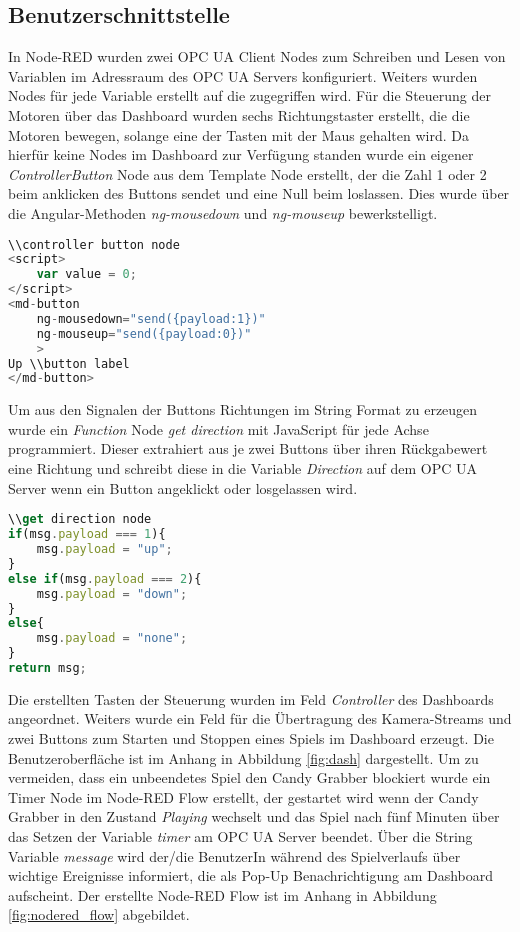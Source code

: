 \documentclass[BMR,Bachelor,ngerman]{twbook}%
\begin{document}
\subsection{Benutzerschnittstelle}
In Node-RED wurden zwei \ac{OPC UA} Client Nodes zum Schreiben und Lesen von Variablen im Adressraum des \ac{OPC UA} Servers konfiguriert. Weiters wurden Nodes für jede Variable erstellt auf die zugegriffen wird. Für die Steuerung der Motoren über das Dashboard wurden sechs Richtungstaster erstellt, die die Motoren bewegen, solange eine der Tasten mit der Maus gehalten wird. Da hierfür keine Nodes im Dashboard zur Verfügung standen wurde ein eigener \emph{ControllerButton} Node aus dem Template Node erstellt, der die Zahl 1 oder 2 beim anklicken des Buttons sendet und eine Null beim loslassen. Dies wurde über die Angular-Methoden \emph{ng-mousedown} und \emph{ng-mouseup} bewerkstelligt.
%
\begin{lstlisting}[language=JavaScript,caption={Programmierung des \emph{ControllerButton} Node für Richtung \emph{Up}},label={sc:callback}]
\\controller button node
<script>
    var value = 0;
</script>
<md-button
    ng-mousedown="send({payload:1})"
    ng-mouseup="send({payload:0})"
    >
Up \\button label
</md-button>
\end{lstlisting}
Um aus den Signalen der Buttons Richtungen im String Format zu erzeugen wurde ein \emph{Function} Node \emph{get direction} mit JavaScript für jede Achse programmiert. Dieser extrahiert aus je zwei Buttons über ihren Rückgabewert eine Richtung und schreibt diese in die Variable \emph{Direction} auf dem \ac{OPC UA} Server wenn ein Button angeklickt oder losgelassen wird.
\begin{lstlisting}[language=JavaScript,caption={Programmierung des \emph{get direction} Node für eine Achse},label={sc:callback}]
\\get direction node
if(msg.payload === 1){
    msg.payload = "up";
}
else if(msg.payload === 2){
    msg.payload = "down";
}
else{
    msg.payload = "none";
}
return msg;
\end{lstlisting}
%
Die erstellten Tasten der Steuerung wurden im Feld \emph{Controller} des Dashboards angeordnet. Weiters wurde ein Feld für die Übertragung des Kamera-Streams und zwei Buttons zum Starten und Stoppen eines Spiels im Dashboard erzeugt. Die Benutzeroberfläche ist im Anhang in Abbildung \ref{fig:dash} dargestellt. Um zu vermeiden, dass ein unbeendetes Spiel den Candy Grabber blockiert wurde ein Timer Node im Node-RED Flow erstellt, der gestartet wird wenn der Candy Grabber in den Zustand \emph{Playing} wechselt und das Spiel nach fünf Minuten über das Setzen der Variable \emph{timer} am \ac{OPC UA} Server beendet. Über die String Variable \emph{message} wird der/die BenutzerIn während des Spielverlaufs über wichtige Ereignisse informiert, die als Pop-Up Benachrichtigung am Dashboard aufscheint. Der erstellte Node-RED Flow ist im Anhang in Abbildung \ref{fig:nodered_flow} abgebildet.
%
\end{document}
